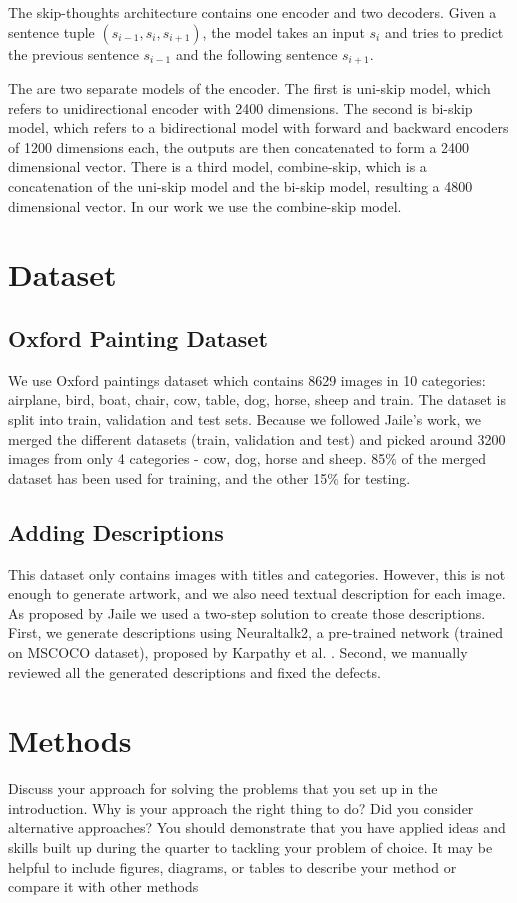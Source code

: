 \documentclass[a4paper]{article}
\begin{document}
The skip-thoughts architecture contains one encoder and two decoders. Given a sentence tuple \((s_{i-1},s_i,s_{i+1})\), 
the model takes an input \(s_i\) and tries to predict the previous sentence \(s_{i-1}\) and the following sentence \(s_{i+1}\). 

The are two separate models of the encoder. The first is uni-skip model, which refers to unidirectional encoder with 2400 dimensions. The second is bi-skip model, which refers to a bidirectional model with forward and backward encoders of 1200 dimensions each, the outputs are then concatenated to form a 2400 dimensional vector. There is a third model, combine-skip, which is a concatenation of the uni-skip model and the bi-skip model, resulting a 4800 dimensional vector. In our work we use the combine-skip model.

\section{Dataset}
\subsection{Oxford Painting Dataset}
We use Oxford paintings dataset \cite{Crowley14,Crowley14a} which contains 8629 images in 10 categories: airplane, bird, boat, chair, cow, table, dog, horse, sheep and train. The dataset is split into train, validation and test sets. Because we followed Jaile's work, we merged the different datasets (train, validation and test) and picked around 3200 images from only 4 categories - cow, dog, horse and sheep. 85\% of the merged dataset has been used for training, and the other 15\% for testing.

\subsection{Adding Descriptions}
This dataset only contains images with titles and categories. However, this is not enough to generate artwork, and we also need textual description for each image.
As proposed by Jaile we used a two-step solution to create those descriptions. First, we generate descriptions using Neuraltalk2, a pre-trained network (trained on MSCOCO dataset), proposed by Karpathy et al. \cite{karpathy2015deep}. Second, we manually reviewed all the generated descriptions and fixed the defects.

\section{Methods}
Discuss your approach for solving the problems that
you set up in the introduction. Why is your approach the right thing to
do? Did you consider alternative approaches? You should demonstrate
that you have applied ideas and skills built up during the quarter to
tackling your problem of choice. It may be helpful to include figures,
diagrams, or tables to describe your method or compare it with other
methods
\end{document}
